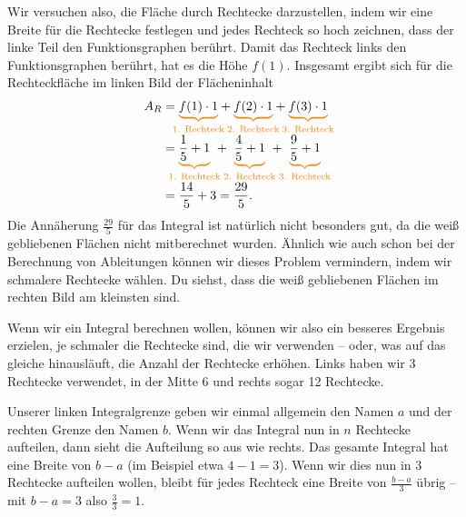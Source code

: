 \documentclass[../../main.tex]{subfiles}
\begin{document}
Wir versuchen also, die Fläche durch Rechtecke darzustellen, indem wir eine Breite für die Rechtecke festlegen und jedes 
Rechteck so hoch zeichnen, dass der linke Teil den Funktionsgraphen berührt. Damit das Rechteck links den Funktionsgraphen
berührt, hat es die Höhe $f(1)$. Insgesamt ergibt sich für die Rechteckfläche im linken Bild der Flächeninhalt
\begin{align*}
    A_R&=\colorbrace{f(1)\cdot 1}{\text{1. Rechteck}}+\colorbrace{f(2)\cdot 1}{\text{2. Rechteck}}+\colorbrace{f(3)\cdot 1}{\text{3. Rechteck}}\\
    &=\colorbrace{\frac{1}{5}+1}{\text{1. Rechteck}}~+~\colorbrace{\frac{4}{5}+1}{\text{2. Rechteck}}~+~\colorbrace{\frac{9}{5}+1}{\text{3. Rechteck}}\\
    &=\frac{14}{5}+3=\frac{29}{5}.
\end{align*}
Die Annäherung $\frac{29}{5}$ für das Integral ist natürlich nicht besonders gut, da die weiß gebliebenen Flächen nicht 
mitberechnet wurden. Ähnlich wie auch schon bei der Berechnung von Ableitungen können wir dieses Problem vermindern,
indem wir schmalere Rechtecke wählen. Du siehst, dass die weiß gebliebenen Flächen im rechten Bild am kleinsten sind.

Wenn wir ein Integral berechnen wollen, können wir also ein besseres Ergebnis erzielen, je schmaler die Rechtecke sind,
die wir verwenden -- oder, was auf das gleiche hinausläuft, die Anzahl der Rechtecke erhöhen. Links haben wir 3 Rechtecke
verwendet, in der Mitte 6 und rechts sogar 12 Rechtecke.

Unserer linken Integralgrenze geben wir einmal allgemein den Namen $a$ und der rechten Grenze den Namen $b$. Wenn wir
das Integral nun in $n$ Rechtecke aufteilen, dann sieht die Aufteilung so aus wie rechts. Das gesamte Integral hat eine
Breite von $b-a$ (im Beispiel etwa $4-1=3$). Wenn wir dies nun in 3 Rechtecke aufteilen wollen, bleibt für jedes Rechteck
eine Breite von $\frac{b-a}{3}$ übrig -- mit $b-a=3$ also $\frac{3}{3}=1$.
\end{document}
